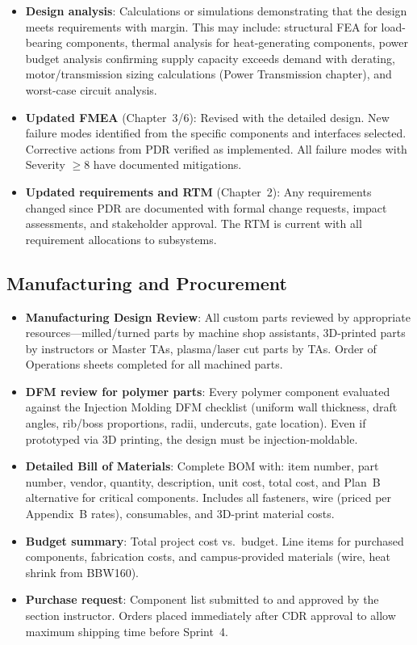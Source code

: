 \documentclass[11pt,letterpaper,twoside,openany]{book}
\begin{document}
\begin{itemize}[leftmargin=1.5em]
\item \textbf{Design analysis}: Calculations or simulations demonstrating that the design meets requirements with margin. This may include: structural FEA for load-bearing components, thermal analysis for heat-generating components, power budget analysis confirming supply capacity exceeds demand with derating, motor/transmission sizing calculations (Power Transmission chapter), and worst-case circuit analysis.
\item \textbf{Updated FMEA} (Chapter~3/6): Revised with the detailed design. New failure modes identified from the specific components and interfaces selected. Corrective actions from PDR verified as implemented. All failure modes with Severity $\geq 8$ have documented mitigations.
\item \textbf{Updated requirements and RTM} (Chapter~2): Any requirements changed since PDR are documented with formal change requests, impact assessments, and stakeholder approval. The RTM is current with all requirement allocations to subsystems.
\end{itemize}

\subsection{Manufacturing and Procurement}

\begin{itemize}[leftmargin=1.5em]
\item \textbf{Manufacturing Design Review}: All custom parts reviewed by appropriate resources---milled/turned parts by machine shop assistants, 3D-printed parts by instructors or Master TAs, plasma/laser cut parts by TAs. Order of Operations sheets completed for all machined parts.
\item \textbf{DFM review for polymer parts}: Every polymer component evaluated against the Injection Molding DFM checklist (uniform wall thickness, draft angles, rib/boss proportions, radii, undercuts, gate location). Even if prototyped via 3D printing, the design must be injection-moldable.
\item \textbf{Detailed Bill of Materials}: Complete BOM with: item number, part number, vendor, quantity, description, unit cost, total cost, and Plan~B alternative for critical components. Includes all fasteners, wire (priced per Appendix~B rates), consumables, and 3D-print material costs.
\item \textbf{Budget summary}: Total project cost vs.\ budget. Line items for purchased components, fabrication costs, and campus-provided materials (wire, heat shrink from BBW160).
\item \textbf{Purchase request}: Component list submitted to and approved by the section instructor. Orders placed immediately after CDR approval to allow maximum shipping time before Sprint~4.
\end{itemize}
\end{document}
